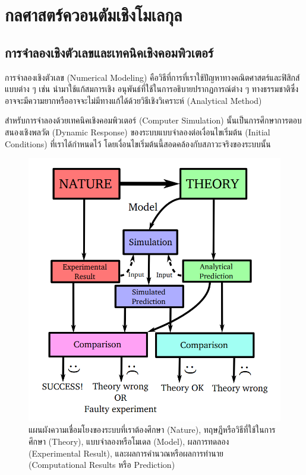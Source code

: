 

\chapter{กลศาสตร์ควอนตัมเชิงโมเลกุล}
\label{ch:mol_qm}

\section{การจำลองเชิงตัวเลขและเทคนิคเชิงคอมพิวเตอร์}

การจำลองเชิงตัวเลข (Numerical Modeling) คือวิธีที่การที่เราใช้ปัญหาทางคณิตศาสตร์และฟิสิกส์แบบต่าง ๆ เช่น นำมาใช้แก้สมการเชิง%
อนุพันธ์ที่ใช้ในการอธิบายปรากฏการณ์ต่าง ๆ ทางธรรมชาติซึ่งอาจจะมีความยากหรืออาจจะไม่มีทางแก้ได้ด้วยวิธีเชิงวิเคราะห์ (Analytical Method)

สำหรับการจำลองด้วยเทคนิคเชิงคอมพิวเตอร์ (Computer Simulation) นั้นเป็นการศึกษาการตอบสนองเชิงพลวัต (Dynamic Response)
ของระบบแบบจำลองต่อเงื่อนไขเริ่มต้น (Initial Conditions) ที่เราได้กำหนดไว้ โดยเงื่อนไขเริ่มต้นนี้สอดคล้องกับสภาวะจริงของระบบนั้น

\begin{figure}[htbp]
    \centering
    \includegraphics[width=0.8\linewidth]{fig/simulation-modeling-graph.png}
    \caption{แผนผังความเชื่อมโยงของระบบที่เราต้องศึกษา (Nature), ทฤษฎีหรือวิธีที่ใช้ในการศึกษา (Theory), แบบจำลองหรือโมเดล
        (Model), ผลการทดลอง (Experimental Result), และผลการคำนวณหรือผลการทำนาย (Computational Results หรือ Prediction)}
    \label{fig:sim_model_graph}
\end{figure}


